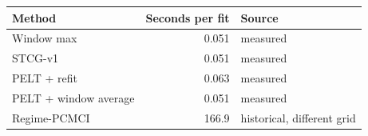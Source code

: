 \begin{tabular}{lrl}
\toprule
Method & Seconds per fit & Source \\
\midrule
Window max & 0.051 & measured \\
STCG-v1 & 0.051 & measured \\
PELT + refit & 0.063 & measured \\
PELT + window average & 0.051 & measured \\
\midrule
Regime-PCMCI & 166.9 & historical, different grid \\
\bottomrule
\end{tabular}
